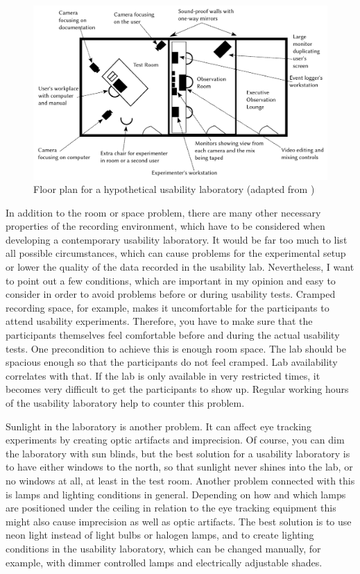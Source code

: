 \documentclass[output=paper]{langsci/langscibook}
\begin{document}
\begin{figure}
 \includegraphics[width=\textwidth]{figures/Roesener6.pdf}
 \caption{Floor plan for a hypothetical usability laboratory (adapted from \citealt[201]{nielsen1993})}
 \label{roesener:fig:6}
\end{figure} 


In addition to the room or space problem, there are many other necessary properties of the recording environment, which have to be considered when developing a contemporary usability laboratory. It would be far too much to list all possible circumstances, which can cause problems for the experimental setup or lower the quality of the data recorded in the usability lab. Nevertheless, I want to point out a few conditions, which are important in my opinion and easy to consider in order to avoid problems before or during usability tests. Cramped recording space, for example, makes it uncomfortable for the participants to attend usability experiments. Therefore, you have to make sure that the participants themselves feel comfortable before and during the actual usability tests. One precondition to achieve this is enough room space. The lab should be spacious enough so that the participants do not feel cramped. Lab availability correlates with that. If the lab is only available in very restricted times, it becomes very difficult to get the participants to show up. Regular working hours of the usability laboratory help to counter this problem.


 Sunlight in the laboratory is another problem. It can affect eye tracking experiments by creating optic artifacts and imprecision. Of course, you can dim the laboratory with sun blinds, but the best solution for a usability laboratory is to have either windows to the north, so that sunlight never shines into the lab, or no windows at all, at least in the test room. Another problem connected with this is lamps and lighting conditions in general. Depending on how and which lamps are positioned under the ceiling in relation to the eye tracking equipment this might also cause imprecision as well as optic artifacts. The best solution is to use neon light instead of light bulbs or halogen lamps, and to create lighting conditions in the usability laboratory, which can be changed manually, for example, with dimmer controlled lamps and electrically adjustable shades.
\end{document}
